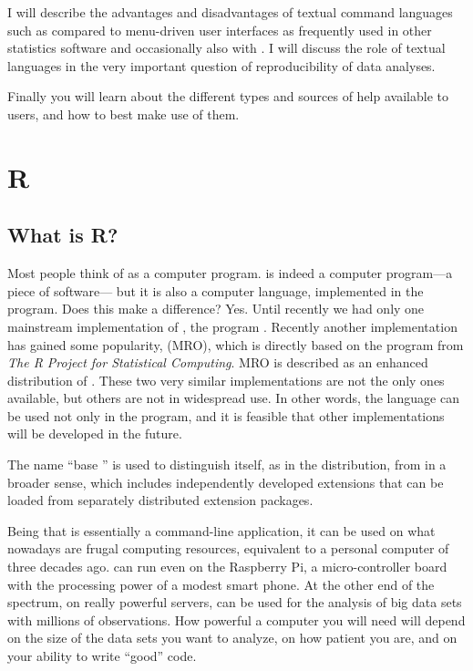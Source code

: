 \documentclass[krantz2]{krantz}\usepackage{knitr}
\begin{document}
I will describe the advantages and disadvantages of textual command languages such as \Rlang compared to menu-driven user interfaces as frequently used in other statistics software and occasionally also with \Rlang. I will discuss the role of textual languages in the very important question of reproducibility of data analyses.

Finally you will learn about the different types and sources of help available to \Rlang users, and how to best make use of them.

\section{R}

\subsection{What is R?}

Most people think
of \Rpgrm as a computer program. \Rpgrm is indeed a computer program---a piece of software--- but it is also a computer language, implemented in the \Rpgrm program. Does this make a difference? Yes. Until recently we had only one mainstream implementation of \Rlang, the program \Rpgrm. Recently another implementation has gained some popularity,  (MRO), which is directly based on the \Rpgrm program from \textit{The R Project for Statistical Computing}. MRO is described as an enhanced distribution of \Rpgrm. These two very similar implementations are not the only ones available, but others are not in widespread use. In other words, the \Rlang language can be used not only in the \Rpgrm program, and it is feasible that other implementations will be developed in the future.

The name ``base \Rlang{}'' is used to distinguish \Rlang itself, as in the \Rpgrm distribution, from \Rlang in a broader sense, which includes independently developed extensions that can be loaded from separately distributed extension packages.

Being that \Rpgrm is essentially a command-line application, it can be used on what nowadays are frugal computing resources, equivalent to a personal computer of three decades ago. \Rpgrm can run even on the Raspberry Pi, a micro-controller board with the processing power of a modest smart phone. At the other end of the spectrum, on really powerful servers, \Rpgrm can be used for the analysis of big data sets with millions of observations. How powerful a computer you will need will depend on the size of the data sets you want to analyze, on how patient you are, and on your ability to write ``good'' code.
\end{document}
